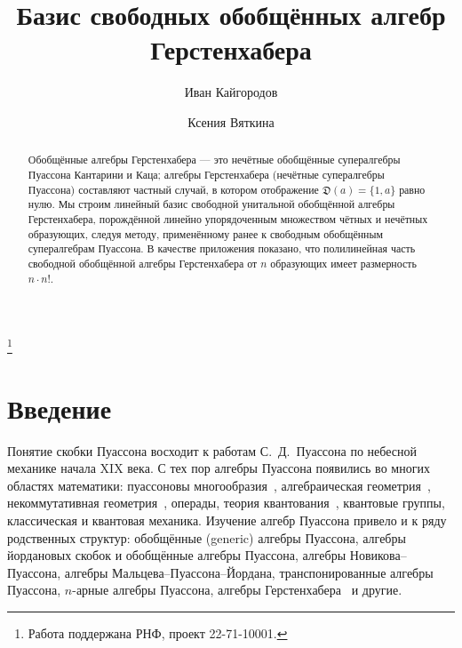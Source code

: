 \documentclass[11pt,reqno]{amsart}
\newcommand{\D}{\mathfrak D}
\theoremstyle{plain}
\theoremstyle{definition}
\theoremstyle{remark}
\begin{document}
\title{Базис свободных обобщённых алгебр Герстенхабера}

\author{Иван Кайгородов}
\address{CMA-UBI, Университет Бейра-Интериор, Ковильян, Португалия}

\author{Ксения Вяткина}
\address{Санкт-Петербургский государственный университет, Санкт-Петербург, Россия}

\thanks{Работа поддержана РНФ, проект 22-71-10001.}


\begin{abstract}
Обобщённые алгебры Герстенхабера --- это нечётные обобщённые супералгебры Пуассона Кантарини и Каца; алгебры Герстенхабера (нечётные супералгебры Пуассона) составляют частный случай, в котором отображение $\D(a)=\{1,a\}$ равно нулю.
Мы строим линейный базис свободной унитальной обобщённой алгебры Герстенхабера, порождённой линейно упорядоченным множеством чётных и нечётных образующих, следуя методу, применённому ранее к свободным обобщённым супералгебрам Пуассона.
В качестве приложения показано, что полилинейная часть свободной обобщённой алгебры Герстенхабера от $n$ образующих имеет размерность $n\cdot n!$.
\end{abstract}

\maketitle

\section{Введение}

Понятие скобки Пуассона восходит к работам С.~Д.~Пуассона по небесной механике начала XIX века.
С тех пор алгебры Пуассона появились во многих областях математики: пуассоновы многообразия~\cite{L1}, алгебраическая геометрия~\cite{BLLM,GK04}, некоммутативная геометрия~\cite{ber08}, операды, теория квантования~\cite{Kon03}, квантовые группы, классическая и квантовая механика.
Изучение алгебр Пуассона привело и к ряду родственных структур: обобщённые (generic) алгебры Пуассона, алгебры йордановых скобок и обобщённые алгебры Пуассона, алгебры Новикова--Пуассона, алгебры Мальцева--Пуассона--Йордана, транспонированные алгебры Пуассона, $n$-арные алгебры Пуассона, алгебры Герстенхабера~\cite{K96} и другие.
\end{document}
